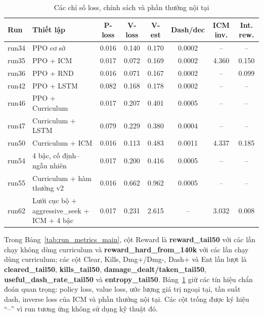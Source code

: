 \begin{table}[H]
    \centering
    \scriptsize
    \setlength{\tabcolsep}{5pt}
    \renewcommand{\arraystretch}{1.15}
    \caption{Các chỉ số loss, chính sách và phần thưởng nội tại}
    \label{tab:run_metrics_aux}
    \begin{tabular}{l p{3.5cm} c c c c c c}
        \toprule
        \textbf{Run} & \textbf{Thiết lập} & \textbf{P-loss} & \textbf{V-loss} & \textbf{V-est} & \textbf{Dash/dec} & \textbf{ICM inv.} & \textbf{Int. rew.} \\
        \midrule
        run34 & PPO cơ sở & 0.016 & 0.140 & 0.170 & 0.0002 & -- & -- \\
        run35 & PPO + ICM & 0.017 & 0.072 & 0.169 & 0.0002 & 4.360 & 0.150 \\
        run36 & PPO + RND & 0.016 & 0.071 & 0.167 & 0.0002 & -- & 0.099 \\
        run42 & PPO + LSTM & 0.082 & 0.168 & 0.178 & 0.0002 & -- & -- \\
        run46 & PPO + Curriculum & 0.017 & 0.207 & 0.401 & 0.0005 & -- & -- \\
        run47 & Curriculum + LSTM & 0.079 & 0.229 & 0.380 & 0.0004 & -- & -- \\
        run50 & Curriculum + ICM & 0.016 & 0.113 & 0.483 & 0.0011 & 4.337 & 0.185 \\
        run54 & 4 bậc, cố định--ngẫu nhiên & 0.017 & 0.200 & 0.416 & 0.0005 & -- & -- \\
        run55 & Curriculum + hàm thưởng v2 & 0.016 & 0.662 & 0.962 & 0.0005 & -- & -- \\
        run62 & Lưới cục bộ + aggressive\_seek + ICM + 4 bậc & 0.017 & 0.231 & 2.615 & -- & 3.032 & 0.008 \\
        \bottomrule
    \end{tabular}
\end{table}

Trong Bảng~\ref{tab:run_metrics_main}, cột Reward là \textbf{reward\_tail50} với các lần chạy không dùng curriculum và \textbf{reward\_hard\_from\_140k} với các lần chạy dùng curriculum; các cột Clear, Kills, Dmg+/Dmg-, Dash+ và Ent lần lượt là \textbf{cleared\_tail50}, \textbf{kills\_tail50}, \textbf{damage\_dealt/taken\_tail50}, \textbf{useful\_dash\_rate\_tail50} và \textbf{entropy\_tail50}. Bảng~\ref{tab:run_metrics_aux} giữ các tín hiệu chẩn đoán quan trọng: policy loss, value loss, ước lượng giá trị ngoại tại, tần suất dash, inverse loss của ICM và phần thưởng nội tại. Các cột trống được ký hiệu ``--'' vì run tương ứng không sử dụng kỹ thuật đó.

